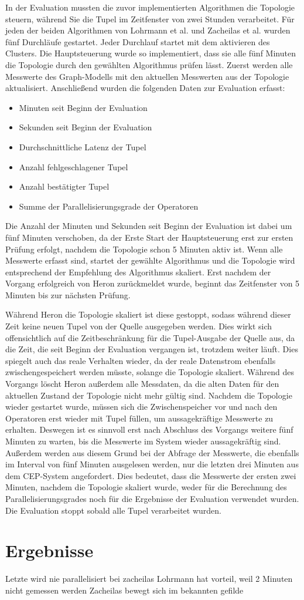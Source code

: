 In der Evaluation mussten die zuvor implementierten Algorithmen die Topologie steuern, während Sie die Tupel im Zeitfenster von zwei Stunden verarbeitet.
Für jeden der beiden Algorithmen von Lohrmann et al. und Zacheilas et al. wurden fünf Durchläufe gestartet.
Jeder Durchlauf startet mit dem aktivieren des Clusters.
Die Hauptsteuerung wurde so implementiert, dass sie alle fünf Minuten die Topologie durch den gewählten Algorithmus prüfen lässt.
Zuerst werden alle Messwerte des Graph-Modells mit den aktuellen Messwerten aus der Topologie aktualisiert.
Anschließend wurden die folgenden Daten zur Evaluation erfasst:
\begin{itemize}
\item{Minuten seit Beginn der Evaluation}
\item{Sekunden seit Beginn der Evaluation}
\item{Durchschnittliche Latenz der Tupel}
\item{Anzahl fehlgeschlagener Tupel}
\item{Anzahl bestätigter Tupel}
\item{Summe der Parallelisierungsgrade der Operatoren}
\end{itemize}
Die Anzahl der Minuten und Sekunden seit Beginn der Evaluation ist dabei um fünf Minuten verschoben, da der Erste Start der Hauptsteuerung erst zur ersten Prüfung erfolgt, nachdem die Topologie schon 5 Minuten aktiv ist.
Wenn alle Messwerte erfasst sind, startet der gewählte Algorithmus und die Topologie wird entsprechend der Empfehlung des Algorithmus skaliert.
Erst nachdem der Vorgang erfolgreich von Heron zurückmeldet wurde, beginnt das Zeitfenster von 5 Minuten bis zur nächsten Prüfung.

Während Heron die Topologie skaliert ist diese gestoppt, sodass während dieser Zeit keine neuen Tupel von der Quelle ausgegeben werden.
Dies wirkt sich offensichtlich auf die Zeitbeschränkung für die Tupel-Ausgabe der Quelle aus, da die Zeit, die seit Beginn der Evaluation vergangen ist, trotzdem weiter läuft.
Dies spiegelt auch das reale Verhalten wieder, da der reale Datenstrom ebenfalls zwischengespeichert werden müsste, solange die Topologie skaliert.
Während des Vorgangs löscht Heron außerdem alle Messdaten, da die alten Daten für den aktuellen Zustand der Topologie nicht mehr gültig sind.
Nachdem die Topologie wieder gestartet wurde, müssen sich die Zwischenspeicher vor und nach den Operatoren erst wieder mit Tupel füllen, um aussagekräftige Messwerte zu erhalten.
Deswegen ist es sinnvoll erst nach Abschluss des Vorgangs weitere fünf Minuten zu warten, bis die Messwerte im System wieder aussagekräftig sind.
Außerdem werden aus diesem Grund bei der Abfrage der Messwerte, die ebenfalls im Interval von fünf Minuten ausgelesen werden, nur die letzten drei Minuten aus dem CEP-System angefordert.
Dies bedeutet, dass die Messwerte der ersten zwei Minuten, nachdem die Topologie skaliert wurde, weder für die Berechnung des Parallelisierungsgrades noch für die Ergebnisse der Evaluation verwendet wurden.
Die Evaluation stoppt sobald alle Tupel verarbeitet wurden.

\section{Ergebnisse}

Letzte wird nie parallelisiert bei zacheilas
Lohrmann hat vorteil, weil 2 Minuten nicht gemessen werden
Zacheilas bewegt sich im bekannten gefilde
